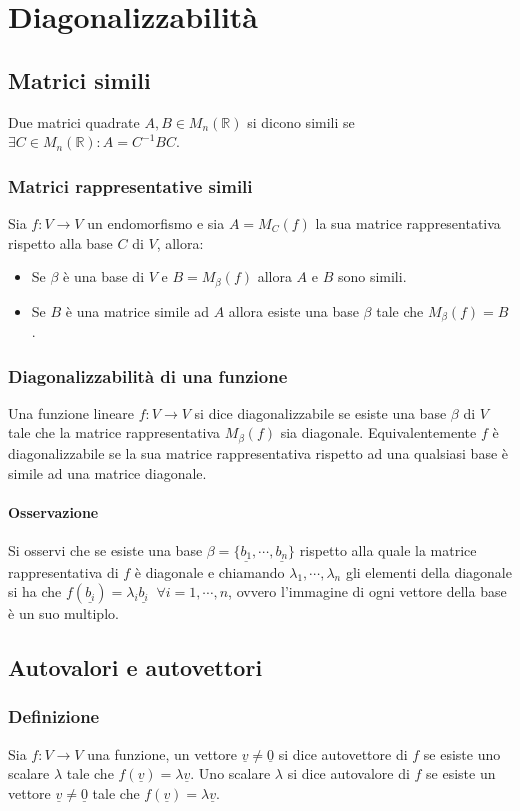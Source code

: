 \chapter{Diagonalizzabilit\`a}
\section{Matrici simili}
Due matrici quadrate $A,B\in M_n(\mathbb{R})$ si dicono simili se $\exists C\in M_n(\mathbb{R}):A=C^{-1}BC$.
\subsection{Matrici rappresentative simili}
Sia $f:V\rightarrow V$ un endomorfismo e sia $A=M_C(f)$ la sua matrice rappresentativa rispetto alla base $C$ di $V$, allora:
\begin{itemize}
\item Se $\beta$ \`e una base di $V$ e $B=M_\beta(f)$ allora $A$ e $B$ sono simili.
\item Se $B$ \`e una matrice simile ad $A$ allora esiste una base $\beta$ tale che $M_\beta(f)=B$.
\end{itemize}
\subsection{Diagonalizzabilit\`a di una funzione}
Una funzione lineare $f:V\rightarrow V$ si dice diagonalizzabile se esiste una base $\beta$ di $V$ tale che la matrice rappresentativa $M_\beta(f)$ sia diagonale. 
Equivalentemente $f$ \`e diagonalizzabile se la sua matrice rappresentativa rispetto ad una qualsiasi base \`e simile ad una matrice diagonale.
\subsubsection{Osservazione}
Si osservi che se esiste una base $\beta=\{\underline{b_1},\cdots,\underline{b_n}\}$ rispetto alla quale la matrice rappresentativa di $f$ \`e diagonale e chiamando $\lambda_1,
\cdots,\lambda_n$ gli elementi della diagonale si ha che $f(\underline{b_i})=\lambda_i\underline{b_i}\;\;\forall i=1,\cdots,n$, ovvero l'immagine di ogni vettore della base \`e 
un suo multiplo.
\section{Autovalori e autovettori}
\subsection{Definizione}
Sia $f:V\rightarrow V$ una funzione, un vettore $\underline{v}\neq\underline{0}$ si dice autovettore di $f$ se esiste uno scalare $\lambda$ tale che $f(\underline{v})=\lambda
\underline{v}$.
Uno scalare $\lambda$ si dice autovalore di $f$ se esiste un vettore $\underline{v}\neq\underline{0}$ tale che $f(\underline{v})=\lambda\underline{v}$.
